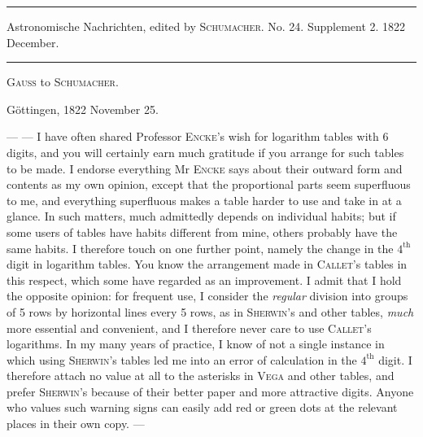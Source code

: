 \par{}\begin{center}\rule{0.72\linewidth}{0.3pt}\par Astronomische Nachrichten, edited by \textsc{Schumacher}. No. 24. Supplement 2. 1822 December.\par\rule{0.72\linewidth}{0.3pt}\end{center}

\begin{center}
\textsc{Gauss} to \textsc{Schumacher}.
\end{center}
\begin{flushright}
Göttingen, 1822 November 25.
\end{flushright}
--- --- I have often shared Professor \textsc{Encke}'s wish for logarithm tables with 6 digits, and you will certainly earn much gratitude if you arrange for such tables to be made. I endorse everything Mr \textsc{Encke} says about their outward form and contents as my own opinion, except that the proportional parts seem superfluous to me, and everything superfluous makes a table harder to use and take in at a glance. In such matters, much admittedly depends on individual habits; but if some users of tables have habits different from mine, others probably have the same habits. I therefore touch on one further point, namely the change in the \(4^{\mathrm{th}}\) digit in logarithm tables. You know the arrangement made in \textsc{Callet}'s tables in this respect, which some have regarded as an improvement. I admit that I hold the opposite opinion: for frequent use, I consider the \textit{regular} division into groups of 5 rows by horizontal lines every 5 rows, as in \textsc{Sherwin}'s and other tables, \textit{much} more essential and convenient, and I therefore never care to use \textsc{Callet}'s logarithms. In my many years of practice, I know of not a single instance in which using \textsc{Sherwin}'s tables led me into an error of calculation in the \(4^{\mathrm{th}}\) digit. I therefore attach no value at all to the asterisks in \textsc{Vega} and other tables, and prefer \textsc{Sherwin}'s because of their better paper and more attractive digits. Anyone who values such warning signs can easily add red or green dots at the relevant places in their own copy. ---
